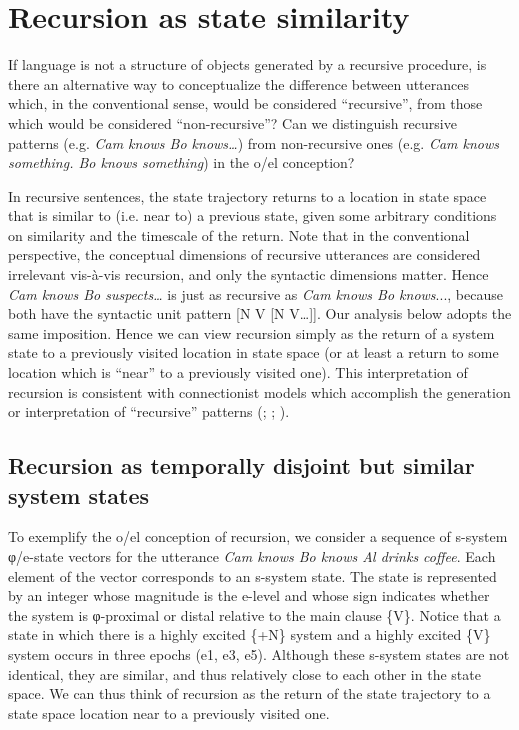 \section{Recursion as state similarity}

If language is not a structure of objects generated by a recursive procedure, is there an alternative way to conceptualize the difference between utterances which, in the conventional sense, would be considered “recursive”, from those which would be considered “non-recursive”? Can we distinguish recursive patterns (e.g. \textit{Cam knows Bo knows…}) from non-recursive ones (e.g. \textit{Cam knows something. Bo knows something}) in the o/el conception? 

  In recursive sentences, the state trajectory returns to a location in state space that is similar to (i.e. near to) a previous state, given some arbitrary conditions on similarity and the timescale of the return. Note that in the conventional perspective, the conceptual dimensions of recursive utterances are considered irrelevant vis-à-vis recursion, and only the syntactic dimensions matter. Hence \textit{Cam knows Bo suspects…} is just as recursive as \textit{Cam knows Bo knows}..., because both have the syntactic unit pattern [N V [N V…]]. Our analysis below adopts the same imposition. Hence we can view recursion simply as the return of a system state to a previously visited location in state space (or at least a return to some location which is “near” to a previously visited one). This interpretation of recursion is consistent with connectionist models which accomplish the generation or interpretation of “recursive” patterns (\citealt{ChristiansenChater1999}; \citealt{Elman1989}; \citealt{Smolensky1990}).

\subsection{Recursion as temporally disjoint but similar system states}

To exemplify the o/el conception of recursion, we consider a sequence of s-system φ/e-state vectors for the utterance \textit{Cam knows Bo knows Al drinks coffee}. Each element of the vector corresponds to an s-system state. The state is represented by an integer whose magnitude is the e-level and whose sign indicates whether the system is φ-proximal or distal relative to the main clause \{V\}. Notice that a state in which there is a highly excited \{+N\} system and a highly excited \{V\} system occurs in three epochs (e1, e3, e5). Although these s-system states are not identical, they are similar, and thus relatively close to each other in the state space. We can thus think of recursion as the return of the state trajectory to a state space location near to a previously visited one.

